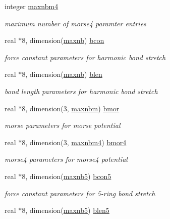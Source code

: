 \begin{DoxyCompactItemize}
integer \hyperlink{classkbonds_a7722f5df93f05ffe051844b4b14fa9de}{maxnbm4}
\begin{DoxyCompactList}\small\item\em maximum number of morse4 paramter entries \end{DoxyCompactList}\item 
real $\ast$8, dimension(\hyperlink{classkbonds_ae14cb6057f6b902041d325f442bb4eb4}{maxnb}) \hyperlink{classkbonds_a5e6c3530241df6ea86379188ff398ace}{bcon}
\begin{DoxyCompactList}\small\item\em force constant parameters for harmonic bond stretch \end{DoxyCompactList}\item 
real $\ast$8, dimension(\hyperlink{classkbonds_ae14cb6057f6b902041d325f442bb4eb4}{maxnb}) \hyperlink{classkbonds_af87c02461c2ee0ac0f82aeefa447ee38}{blen}
\begin{DoxyCompactList}\small\item\em bond length parameters for harmonic bond stretch \end{DoxyCompactList}\item 
real $\ast$8, dimension(3, \hyperlink{classkbonds_a479b8df9e16642b87303fc1f3bd06d26}{maxnbm}) \hyperlink{classkbonds_a177252a3554425a3c0e0ba3032adead6}{bmor}
\begin{DoxyCompactList}\small\item\em morse parameters for morse potential \end{DoxyCompactList}\item 
real $\ast$8, dimension(3, \hyperlink{classkbonds_a7722f5df93f05ffe051844b4b14fa9de}{maxnbm4}) \hyperlink{classkbonds_aa21c00518a1013918014dcba5f0e6798}{bmor4}
\begin{DoxyCompactList}\small\item\em morse4 parameters for morse4 potential \end{DoxyCompactList}\item 
real $\ast$8, dimension(\hyperlink{classkbonds_ac0a19701e66f2ba2a514010e46f3e21f}{maxnb5}) \hyperlink{classkbonds_af68f430fbe6e2899f8fbf5ed22a89b3d}{bcon5}
\begin{DoxyCompactList}\small\item\em force constant parameters for 5-\/ring bond stretch \end{DoxyCompactList}\item 
real $\ast$8, dimension(\hyperlink{classkbonds_ac0a19701e66f2ba2a514010e46f3e21f}{maxnb5}) \hyperlink{classkbonds_a5feaf96447df676481cc06acb221c02f}{blen5}

\end{DoxyCompactItemize}

